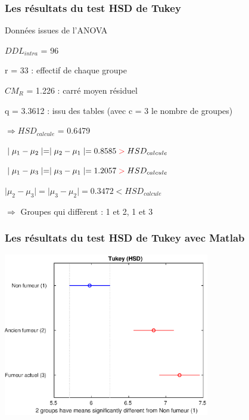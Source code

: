 \documentclass{beamer}
\begin{document}
\begin{frame}
	\frametitle{Les résultats du test HSD de Tukey}
	
	\begin{block}{Données issues de l'ANOVA}
		\begin{itemize}
			\item[•] $DDL_{intra}$ = 96 
			\item[•] r = 33 : effectif de chaque groupe
			\item[•] $CM_R$ = 1.226 : carré moyen résiduel
			\item[•] q = 3.3612 : issu des tables (avec c = 3 le nombre de groupes)
			\begin{center}
				\item[] $\Rightarrow HSD_{calcule}$ = 0.6479
			\end{center}	
		\end{itemize}
	\end{block}
	
	\begin{itemize}		
	  \item[•]$\mid{\mu_1-\mu_2}\mid = \mid{\mu_2-\mu_1}\mid = 0.8585 \color{red} > \color{black} HSD_{calcule}$ \\
	  \item[•]$\mid{\mu_1-\mu_3}\mid = \mid{\mu_3-\mu_1}\mid = 1.2057 \color{red} > \color{black} HSD_{calcule}$ \\
	  \item[•]$\mid{\mu_2-\mu_3}\mid = \mid{\mu_3-\mu_2}\mid = 0.3472 < HSD_{calcule}$ \\
	  \begin{center}
	    \item[] $\Rightarrow $ Groupes qui diffèrent : 1 et 2, 1 et 3 \\
	  \end{center}
	\end{itemize}
\end{frame}

\begin{frame}
	\frametitle{Les résultats du test HSD de Tukey avec Matlab}
	
	\centerline{\includegraphics[width=9cm]{Images/TukeyHSD}}
\end{frame}
\end{document}
